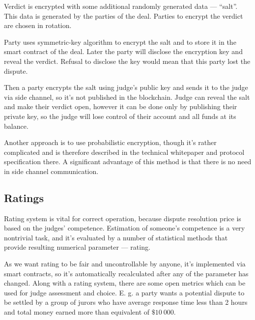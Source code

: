 \documentclass[12pt]{article}
\begin{document}
Verdict is encrypted with some additional randomly generated data — ``salt''. This data is generated by the parties of the deal. Parties to
encrypt the verdict are chosen in rotation.

Party uses symmetric-key algorithm to encrypt the salt and to store it in the smart contract of the deal. Later the party will disclose the
encryption key and reveal the verdict. Refusal to disclose the key would mean that this party lost the dispute.

Then a party encrypts the salt using judge’s public key and sends it to the judge via side channel, so it’s not published in the blockchain.
Judge can reveal the salt and make their verdict open, however it can be done only by publishing their private key, so the judge will lose
control of their account and all funds at its balance.

Another approach is to use probabilistic encryption, though it’s rather complicated and is therefore described in the technical whitepaper
and protocol specification there. A significant advantage of this method is that there is no need in side channel communication.

\subsection{Ratings}
Rating system is vital for correct operation, because dispute resolution price is based on the judges’ competence. Estimation of someone's
competence is a very nontrivial task, and it’s evaluated by a number of statistical methods that provide resulting numerical parameter —
rating. 

As we want rating to be fair and uncontrollable by anyone, it’s implemented via smart contracts, so it’s automatically recalculated after
any of the parameter has changed. Along with a rating system, there are some open metrics which can be used for judge assessment and choice.
E. g. a party wants a potential dispute to be settled by a group of jurors who have average response time less than 2 hours and total money
earned more than equivalent of $\$10\ 000$.
\end{document}
